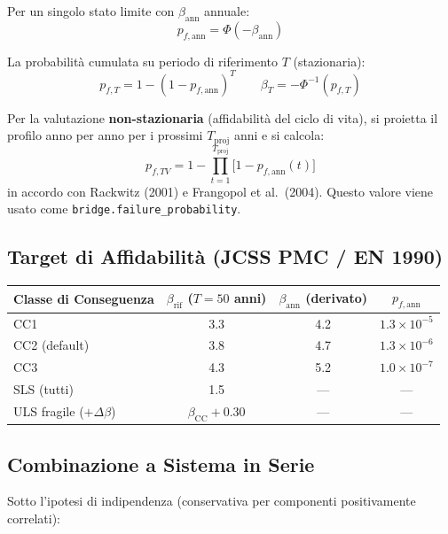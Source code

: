 \documentclass[11pt,a4paper]{article}
\begin{document}
Per un singolo stato limite con $\beta_{\text{ann}}$ annuale:
\begin{equation}
  p_{f,\text{ann}} = \Phi(-\beta_{\text{ann}})
\end{equation}

La probabilità cumulata su periodo di riferimento $T$ (stazionaria):
\begin{equation}
  p_{f,T} = 1 - (1 - p_{f,\text{ann}})^T
  \qquad
  \beta_T = -\Phi^{-1}(p_{f,T})
\end{equation}

Per la valutazione \textbf{non-stazionaria} (affidabilità del ciclo di vita), si proietta il profilo anno per anno per i prossimi $T_{\text{proj}}$ anni e si calcola:
\begin{equation}
  p_{f,TV} = 1 - \prod_{t=1}^{T_{\text{proj}}} \bigl[1 - p_{f,\text{ann}}(t)\bigr]
\end{equation}
in accordo con Rackwitz (2001) e Frangopol et al.\ (2004). Questo valore viene usato come \texttt{bridge.failure\_probability}.

\subsection{Target di Affidabilità (JCSS PMC / EN 1990)}

\begin{center}
\begin{tabular}{lccc}
\toprule
\textbf{Classe di Conseguenza} & $\beta_{\text{rif}}$ ($T=50$ anni) & $\beta_{\text{ann}}$ (derivato) & $p_{f,\text{ann}}$ \\
\midrule
CC1 & 3.3 & 4.2 & $1.3 \times 10^{-5}$ \\
CC2 (default) & 3.8 & 4.7 & $1.3 \times 10^{-6}$ \\
CC3 & 4.3 & 5.2 & $1.0 \times 10^{-7}$ \\
\midrule
SLS (tutti) & 1.5 & --- & --- \\
ULS fragile ($+\Delta\beta$) & $\beta_{\text{CC}} + 0.30$ & --- & --- \\
\bottomrule
\end{tabular}
\end{center}

\subsection{Combinazione a Sistema in Serie}

Sotto l'ipotesi di indipendenza (conservativa per componenti positivamente correlati):
\end{document}
